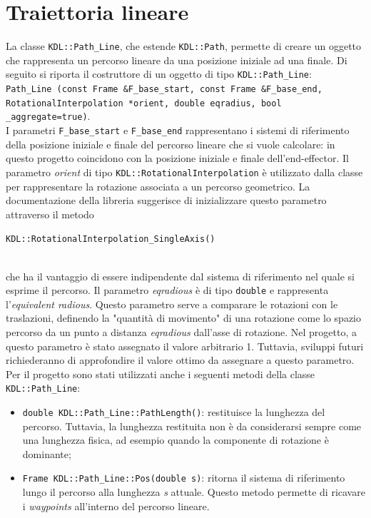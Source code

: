\section{Traiettoria lineare} \label{cap_lt}
La classe \texttt{KDL::Path\_Line}, che estende \texttt{KDL::Path}, permette di creare un oggetto che rappresenta un percorso lineare da una posizione iniziale ad una finale. Di seguito si riporta il costruttore di un oggetto di tipo \texttt{KDL::Path\_Line}: \\ \texttt{Path\_Line (const Frame \&F\_base\_start, const Frame \&F\_base\_end, RotationalInterpolation *orient, double eqradius, bool \_aggregate=true)}.\\ I parametri \texttt{F\_base\_start} e \texttt{F\_base\_end} rappresentano i sistemi di riferimento della posizione iniziale e finale del percorso lineare che si vuole calcolare: in questo progetto coincidono con la posizione iniziale e finale dell'end-effector. Il parametro \textit{orient} di tipo \texttt{KDL::RotationalInterpolation} è utilizzato dalla classe per rappresentare la rotazione associata a un percorso geometrico. La documentazione della libreria suggerisce di inizializzare questo parametro attraverso il metodo \\ \centerline{\texttt{KDL::RotationalInterpolation\_SingleAxis()}} \\ che ha il vantaggio di essere indipendente dal sistema di riferimento nel quale si esprime il percorso. Il parametro \textit{eqradious} è di tipo \texttt{double} e rappresenta l'\textit{equivalent radious}. Questo parametro serve a comparare le rotazioni con le traslazioni, definendo la "quantità di movimento" di una rotazione come lo spazio percorso da un punto a distanza \textit{eqradious} dall'asse di rotazione. Nel progetto, a questo parametro è stato assegnato il valore arbitrario 1. Tuttavia, sviluppi futuri richiederanno di approfondire il valore ottimo da assegnare a questo parametro.
Per il progetto sono stati utilizzati anche i seguenti metodi della classe \texttt{KDL::Path\_Line}:
\begin{itemize}
	\item \texttt{double KDL::Path\_Line::PathLength()}: restituisce la lunghezza del percorso. Tuttavia, la lunghezza restituita non è da considerarsi sempre come una lunghezza fisica, ad esempio quando la componente di rotazione è dominante;
	\item \texttt{Frame KDL::Path\_Line::Pos(double s)}: ritorna il sistema di riferimento lungo il percorso alla lunghezza \textit{s} attuale. Questo metodo permette di ricavare i \textit{waypoints} all'interno del percorso lineare.
\end{itemize}

